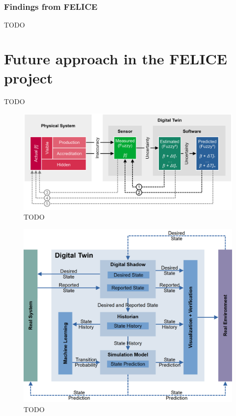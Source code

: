 \documentclass[9pt,conference]{IEEEtran}
\begin{document}
    \subsubsection{Findings from FELICE}
    TODO

 

    \section{Future approach in the FELICE project}
    \label{section:framework_1}
    TODO

    \begin{figure}[htbp]
        \includegraphics[width=\columnwidth]{Digital Twin Deviation.png}
        \caption{TODO}
        \label{todo-2}
    \end{figure}

    \begin{figure}[htbp]
        \includegraphics[width=\columnwidth]{Digital Twin.png}
        \caption{TODO}
        \label{todo-1}
    \end{figure}
\end{document}
